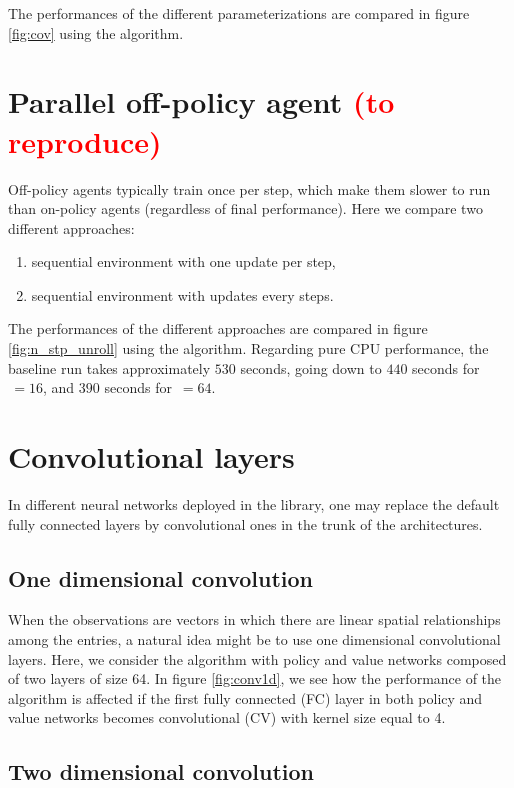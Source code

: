 The performances of the different parameterizations are compared in figure \ref{fig:cov} using the \ppo algorithm.



\section{Parallel off-policy agent \textcolor{red}{(to reproduce)}}

Off-policy agents typically train once per step, which make them slower to run than on-policy agents (regardless of final performance). Here we  compare two different approaches:

\begin{enumerate}
	\item sequential environment with one update per step,
	\item sequential environment with  updates every  steps.
\end{enumerate}

The performances of the different approaches are compared in figure \ref{fig:n_stp_unroll} using the \tdt algorithm. Regarding pure CPU performance, the baseline run takes approximately $530$ seconds, going down to $440$ seconds for $\, = 16$, and $390$ seconds for $\, = 64$.



\section{Convolutional layers}
In different neural networks deployed in the library, one may replace the default fully connected layers by convolutional ones in the trunk of the architectures.
\subsection{One dimensional convolution}
When the observations are vectors in which there are linear spatial relationships among the entries, a natural idea might be to use one dimensional convolutional layers. Here, we consider the \ppo algorithm with policy and value networks composed of two layers of size 64. In figure \ref{fig:conv1d}, we see how the performance of the algorithm is affected if the first fully connected (FC) layer in both policy and value networks becomes convolutional (CV) with kernel size equal to 4. 



\subsection{Two dimensional convolution}

